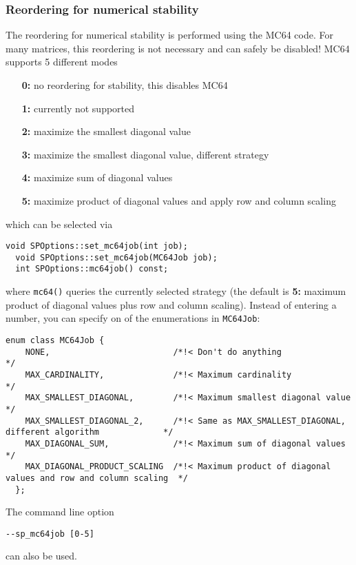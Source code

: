 \documentclass{article}
\begin{document}
\subsubsection{Reordering for numerical stability}\label{sec::mc64}
The reordering for numerical stability is performed using the MC64
code. For many matrices, this reordering is not necessary and can
safely be disabled! MC64 supports 5 different modes
{\small \begin{itemize}
\item[\textbf{0:}] no reordering for stability, this disables MC64
\item[\textbf{1:}] currently not supported
\item[\textbf{2:}] maximize the smallest diagonal value
\item[\textbf{3:}] maximize the smallest diagonal value, different strategy
\item[\textbf{4:}] maximize sum of diagonal values
\item[\textbf{5:}] maximize product of diagonal values and apply row and column scaling
\end{itemize}}
which can be selected via
\begin{lstlisting}[style=C]
  void SPOptions::set_mc64job(int job);
  void SPOptions::set_mc64job(MC64Job job);
  int SPOptions::mc64job() const;
\end{lstlisting}
where \lstinline[style=C]!mc64()! queries the currently selected
strategy (the default is \textbf{5:} maximum product of diagonal
values plus row and column scaling). Instead of entering a number, you
can specify on of the enumerations in \lstinline[style=C]!MC64Job!:
\begin{lstlisting}[style=C]
  enum class MC64Job {
    NONE,                         /*!< Don't do anything                                              */
    MAX_CARDINALITY,              /*!< Maximum cardinality                                            */
    MAX_SMALLEST_DIAGONAL,        /*!< Maximum smallest diagonal value                                */
    MAX_SMALLEST_DIAGONAL_2,      /*!< Same as MAX_SMALLEST_DIAGONAL, different algorithm             */
    MAX_DIAGONAL_SUM,             /*!< Maximum sum of diagonal values                                 */
    MAX_DIAGONAL_PRODUCT_SCALING  /*!< Maximum product of diagonal values and row and column scaling  */
  };
\end{lstlisting}
The command line option
\begin{lstlisting}[style=Bash]
  --sp_mc64job [0-5]
\end{lstlisting}
can also be used.
\end{document}
